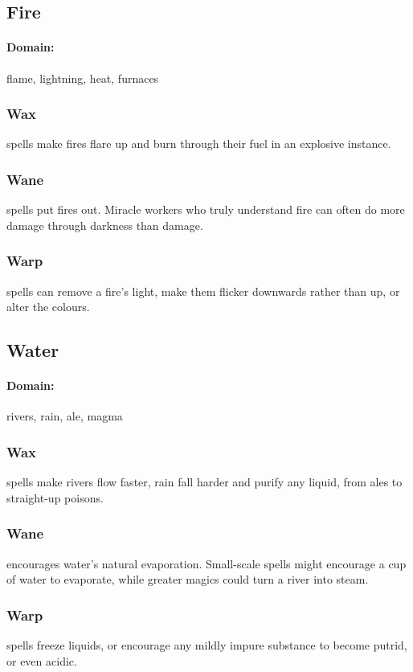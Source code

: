 \begin{multicols}{2}
\subsection{Fire}
\paragraph{Domain:}
flame, lightning, heat, furnaces


\subsubsection{Wax}
spells make fires flare up and burn through their fuel in an explosive instance.

\subsubsection{Wane}
spells put fires out.
Miracle workers who truly understand fire can often do more damage through darkness than damage.

\subsubsection{Warp}
spells can remove a fire's light, make them flicker downwards rather than up, or alter the colours.

\subsection{Water}
\paragraph{Domain:}
rivers, rain, ale, magma


\subsubsection{Wax}
spells make rivers flow faster, rain fall harder and purify any liquid, from ales to straight-up poisons.

\subsubsection{Wane}
encourages water's natural evaporation.
Small-scale spells might encourage a cup of water to evaporate, while greater magics could turn a river into steam.

\subsubsection{Warp}
spells freeze liquids, or encourage any mildly impure substance to become putrid, or even acidic.


\end{multicols}
